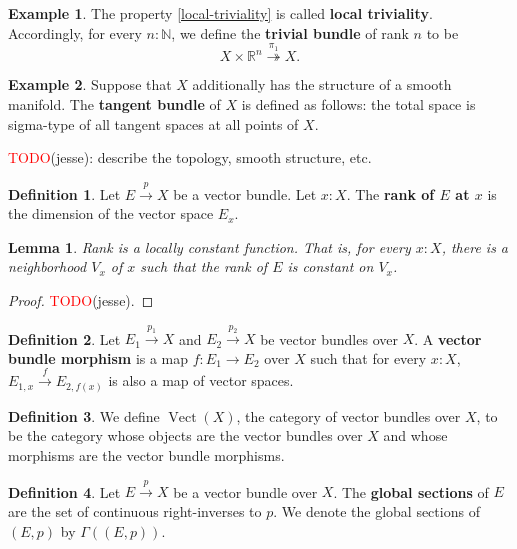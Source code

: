 \documentclass[11pt]{article}
\newcommand{\R}{\mathbb{R}}
\newcommand{\remph}[1]{\textcolor{red}{#1}}
\newcommand{\TODO}{\remph{TODO}}
\newcommand{\Vect}{\operatorname{Vect}}
\theoremstyle{plain}
\newtheorem{lemma}{Lemma}[section]
\theoremstyle{definition}
\newtheorem{definition}{Definition}[section]
\newtheorem{example}{Example}[section]
\newcommand{\N}{\mathbb{N}}
\begin{document}
\begin{example}\label{example-trivial-bundle}
  The property \ref{local-triviality} is called \textbf{local triviality}. Accordingly, for every \(n : \N\), we define the \textbf{trivial bundle} of rank \(n\) to be
  \[
    X \times \R^n \overset{\pi_1}{\twoheadrightarrow} X.
  \]
\end{example}

\begin{example}\label{example-tangent-bundle}
  Suppose that \(X\) additionally has the structure of a smooth manifold. The \textbf{tangent bundle} of \(X\) is defined as follows: the total space is sigma-type of all tangent spaces at all points of \(X\).

  \TODO(jesse): describe the topology, smooth structure, etc.
\end{example}

\begin{definition}\label{def-rank}
  Let \(E \overset{p}{\to} X\) be a vector bundle. Let \(x : X\). The \textbf{rank of \(E\) at \(x\)} is the dimension of the vector space \(E_x\).
\end{definition}

\begin{lemma}\label{lemma-rank-locally-constant}
  Rank is a locally constant function. That is, for every \(x : X\), there is a neighborhood \(V_{x}\) of \(x\) such that the rank of \(E\) is constant on \(V_x\).
\end{lemma}

\begin{proof}
  \TODO(jesse).
\end{proof}

\begin{definition} \label{def-vector-bundle-homomorphism}
  Let \(E_1 \overset{p_1}{\to} X\) and \(E_2 \overset{p_2}{\to} X\) be vector bundles over \(X\).
  A \textbf{vector bundle morphism} is a map \(f : E_1 \to E_2\) over \(X\) such that for every \(x : X\), \(E_{1,x} \overset{f}{\to} E_{2,f(x)}\) is also a map of vector spaces.
\end{definition}

\begin{definition} \label{def-category-vector-bundles}
  We define \(\Vect(X)\), the category of vector bundles over \(X\), to be the category whose objects are the vector bundles over \(X\) and whose morphisms are the vector bundle morphisms.
\end{definition}

\begin{definition}\label{def-global-sections}
  Let \(E \overset{p}{\to} X\) be a vector bundle over \(X\). The \textbf{global sections} of \(E\) are the set of continuous right-inverses to \(p\). We denote the global sections of \((E,p)\) by \(\Gamma((E,p))\).  
\end{definition}
\end{document}
